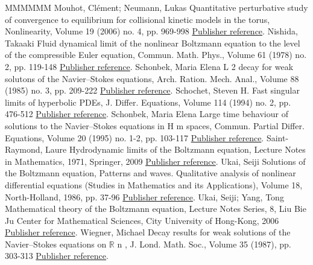 \documentclass[11pt]{article}
\theoremstyle{definition}
\numberwithin{equation}{section}
\numberwithin{figure}{section}
\numberwithin{table}{section}
\begin{document}
\begin{thebibliography}{MMMMMM}
 Mouhot, Clément; Neumann, Lukas Quantitative perturbative study of convergence to equilibrium for collisional kinetic models in the torus, Nonlinearity, Volume 19 (2006) no. 4, pp. 969-998 \href{https://ahl.centre-mersenne.org/item/AHL_2020__3__561_0/#Mouhot-Neumann}{Publisher reference}.
 Nishida, Takaaki Fluid dynamical limit of the nonlinear Boltzmann equation to the level of the compressible Euler equation, Commun. Math. Phys., Volume 61 (1978) no. 2, pp. 119-148 \href{https://ahl.centre-mersenne.org/item/AHL_2020__3__561_0/#Nishida}{Publisher reference}.
 Schonbek, Maria Elena L 2  decay for weak solutons of the Navier–Stokes equations, Arch. Ration. Mech. Anal., Volume 88 (1985) no. 3, pp. 209-222 \href{https://ahl.centre-mersenne.org/item/AHL_2020__3__561_0/#Schonbek24}{Publisher reference}.
 Schochet, Steven H. Fast singular limits of hyperbolic PDEs, J. Differ. Equations, Volume 114 (1994) no. 2, pp. 476-512 \href{https://ahl.centre-mersenne.org/item/AHL_2020__3__561_0/#Schochet}{Publisher reference}.
 Schonbek, Maria Elena Large time behaviour of solutions to the Navier–Stokes equations in H m  spaces, Commun. Partial Differ. Equations, Volume 20 (1995) no. 1-2, pp. 103-117 \href{https://ahl.centre-mersenne.org/item/AHL_2020__3__561_0/#Schonbek}{Publisher reference}.
 Saint-Raymond, Laure Hydrodynamic limits of the Boltzmann equation, Lecture Notes in Mathematics, 1971, Springer, 2009 \href{https://ahl.centre-mersenne.org/item/AHL_2020__3__561_0/#Saint-Raymond}{Publisher reference}.
 Ukai, Seiji Solutions of the Boltzmann equation, Patterns and waves. Qualitative analysis of nonlinear differential equations (Studies in Mathematics and its Applications), Volume 18, North-Holland, 1986, pp. 37-96 \href{https://ahl.centre-mersenne.org/item/AHL_2020__3__561_0/#Ukai}{Publisher reference}.
 Ukai, Seiji; Yang, Tong Mathematical theory of the Boltzmann equation, Lecture Notes Series, 8, Liu Bie Ju Center for Mathematical Sciences, City University of Hong-Kong, 2006 \href{https://ahl.centre-mersenne.org/item/AHL_2020__3__561_0/#Ukai-Yang}{Publisher reference}.
 Wiegner, Michael Decay results for weak solutions of the Navier–Stokes equations on \(\mathbb{R}\) n , J. Lond. Math. Soc., Volume 35 (1987), pp. 303-313 \href{https://ahl.centre-mersenne.org/item/AHL_2020__3__561_0/#wiegner}{Publisher reference}.
\end{thebibliography}
\end{document}
